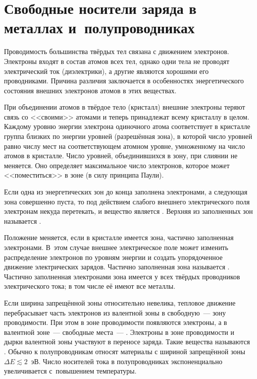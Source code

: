 \section{Свободные носители заряда в металлах и~полупроводниках}

Проводимость большинства твёрдых тел связана с движением электронов. Электроны
входят в состав атомов всех тел, однако одни тела не проводят электрический ток
(диэлектрики), а другие являются хорошими его проводниками. Причина различия
заключается в особенностях энергетического состояния внешних электронов атомов в
этих веществах.

При объединении атомов в твёрдое тело (кристалл) внешние электроны теряют связь
со <<своими>> атомами и теперь принадлежат всему кристаллу в целом. Каждому
уровню энергии электрона одиночного атома соответствует в кристалле группа
близких по энергии уровней (разрешённая зона), в которой число уровней равно
числу мест на соответствующем атомном уровне, умноженному на число атомов в
кристалле. Число уровней, объединившихся в зону, при слиянии не меняется. Оно
определяет максимальное число электронов, которое может <<поместиться>> в зоне
(в силу принципа Паули).

Если одна из энергетических зон до конца заполнена электронами, а следующая зона
совершенно пуста, то под действием слабого внешнего электрического поля
электронам некуда перетекать, и вещество является .
Верхняя из заполненных зон называется .

Положение меняется, если в кристалле имеется зона, частично заполненная
электронами. В~этом случае внешнее электрическое поле может изменить
распределение электронов по уровням энергии и создать упорядоченное движение
электрических зарядов. Частично заполненная зона называется . Частично заполненная электронами зона имеется у всех твёрдых
проводников электрического тока; в том числе её имеют все металлы.

Если ширина запрещённой зоны относительно невелика, тепловое движение
перебрасывает часть электронов из валентной зоны в свободную~--- зону
проводимости. При этом в зоне проводимости появляются электроны, а в валентной
зоне~--- свободные места~--- . Электроны в зоне проводимости и
дырки валентной зоны участвуют в переносе заряда. Такие вещества называются
. Обычно к полупроводникам относят материалы с
шириной запрещённой зоны $\Delta E \lesssim 2$~эВ. Число носителей тока в
полупроводниках экспоненциально увеличивается с~повышением температуры.

